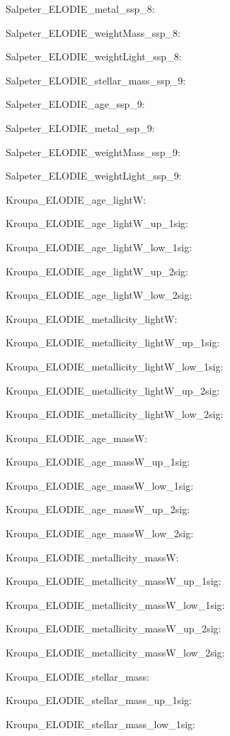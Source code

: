 \item Salpeter\_ELODIE\_metal\_ssp\_8: 
\item Salpeter\_ELODIE\_weightMass\_ssp\_8: 
\item Salpeter\_ELODIE\_weightLight\_ssp\_8: 
\item Salpeter\_ELODIE\_stellar\_mass\_ssp\_9: 
\item Salpeter\_ELODIE\_age\_ssp\_9: 
\item Salpeter\_ELODIE\_metal\_ssp\_9: 
\item Salpeter\_ELODIE\_weightMass\_ssp\_9: 
\item Salpeter\_ELODIE\_weightLight\_ssp\_9: 
\item Kroupa\_ELODIE\_age\_lightW: 
\item Kroupa\_ELODIE\_age\_lightW\_up\_1sig: 
\item Kroupa\_ELODIE\_age\_lightW\_low\_1sig: 
\item Kroupa\_ELODIE\_age\_lightW\_up\_2sig: 
\item Kroupa\_ELODIE\_age\_lightW\_low\_2sig: 
\item Kroupa\_ELODIE\_metallicity\_lightW: 
\item Kroupa\_ELODIE\_metallicity\_lightW\_up\_1sig: 
\item Kroupa\_ELODIE\_metallicity\_lightW\_low\_1sig: 
\item Kroupa\_ELODIE\_metallicity\_lightW\_up\_2sig: 
\item Kroupa\_ELODIE\_metallicity\_lightW\_low\_2sig: 
\item Kroupa\_ELODIE\_age\_massW: 
\item Kroupa\_ELODIE\_age\_massW\_up\_1sig: 
\item Kroupa\_ELODIE\_age\_massW\_low\_1sig: 
\item Kroupa\_ELODIE\_age\_massW\_up\_2sig: 
\item Kroupa\_ELODIE\_age\_massW\_low\_2sig: 
\item Kroupa\_ELODIE\_metallicity\_massW: 
\item Kroupa\_ELODIE\_metallicity\_massW\_up\_1sig: 
\item Kroupa\_ELODIE\_metallicity\_massW\_low\_1sig: 
\item Kroupa\_ELODIE\_metallicity\_massW\_up\_2sig: 
\item Kroupa\_ELODIE\_metallicity\_massW\_low\_2sig: 
\item Kroupa\_ELODIE\_stellar\_mass: 
\item Kroupa\_ELODIE\_stellar\_mass\_up\_1sig: 
\item Kroupa\_ELODIE\_stellar\_mass\_low\_1sig: 
